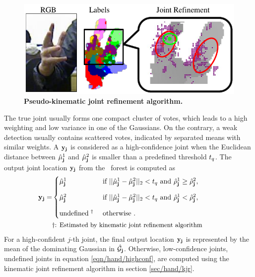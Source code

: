 \begin{figure}[ht]
	\centering
	\includegraphics[width=0.8\linewidth]{fig/hand/fig3.pdf}
	\caption{\textbf{Pseudo-kinematic joint refinement algorithm.}}
	\label{fig/hand/refine}
\end{figure}

The true joint usually forms one compact cluster of votes, which leads to a high weighting and low variance in one of the Gaussians. 
On the contrary, a weak detection usually contains scattered votes, indicated by separated means with similar weights. 
A $\mathbf{y}_{\mathbf{j}}$ is considered as a high-confidence joint when the Euclidean distance between $\hat{\mu}_{\mathbf{j}}^{1}$ and $\hat{\mu}_{\mathbf{j}}^{2}$ is smaller than a predefined threshold $t_{q}$. The output joint location $\mathbf{y}_{\mathbf{j}}$ from the \STR\ forest is computed as
\begin{equation}
	\begin{aligned}
	\testonejoint_{\joint} = &  
	\begin{cases}
		\hat{\mu}_{\joint}^{1} & \mbox{ if } ||\hat{\mu}_{\joint}^{1} - \hat{\mu}_{\joint}^{2}||_2 < \testqualthres \mbox{ and } \hat{\rho}_{\joint}^{1} \ge \hat{\rho}_{\joint}^{2}, \\[3mm] 
		\hat{\mu}_{\joint}^{2} & \mbox{ if } ||\hat{\mu}_{\joint}^{1} - \hat{\mu}_{\joint}^{2}||_2 < \testqualthres \mbox{ and } \hat{\rho}_{\joint}^{1} < \hat{\rho}_{\joint}^{2}, \\[3mm] 
		\mbox{undefined$\;^{\dagger}$} & \mbox{ otherwise }. 
	\end{cases}\\
	& \parbox{0.7\linewidth}{\small $\dagger$: Estimated by kinematic joint refinement algorithm}
	\end{aligned}
	\label{eqn/hand/highconf}
\end{equation}
For a high-confident $j$-th joint, the final output location $\mathbf{y}_{\mathbf{j}}$ is represented by the mean of the dominating Gaussian in $\hat{\mathcal{G}}_{\mathbf{j}}$. Otherwise, low-confidence joints, \ie undefined joints in equation \ref{eqn/hand/highconf}, are computed using the kinematic joint refinement algorithm in section \ref{sec/hand/kjr}. 

